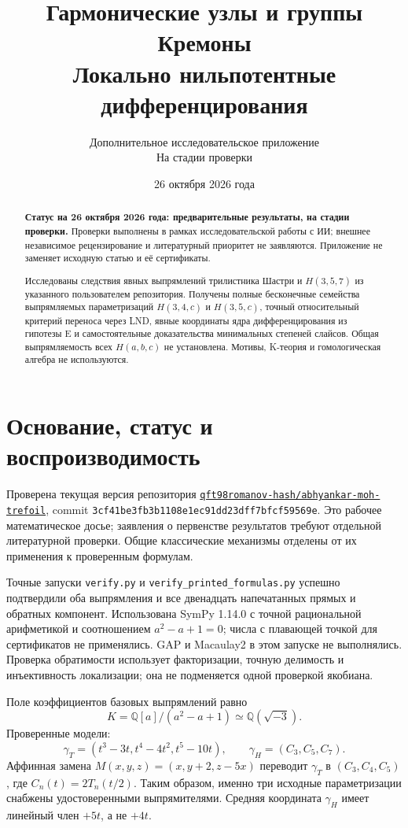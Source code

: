 \documentclass[11pt,a4paper]{article}
\title{\fontsize{18}{23}\selectfont Гармонические узлы и группы Кремоны\protect\\Локально нильпотентные дифференцирования}
\author{Дополнительное исследовательское приложение\\На стадии проверки}
\date{26 октября 2026 года}
\begin{document}
\raggedright
\maketitle
\begin{abstract}
\textbf{Статус на 26 октября 2026 года: предварительные результаты,
на стадии проверки.} Проверки выполнены в рамках исследовательской работы
с ИИ; внешнее независимое рецензирование и литературный приоритет не заявляются.
Приложение не заменяет исходную статью и её сертификаты.


Исследованы следствия явных выпрямлений трилистника Шастри и
$H(3,5,7)$ из указанного пользователем репозитория. Получены полные
бесконечные семейства выпрямляемых параметризаций $H(3,4,c)$ и
$H(3,5,c)$, точный относительный критерий переноса через LND,
явные координаты ядра дифференцирования из гипотезы E и
самостоятельные доказательства минимальных степеней слайсов.
Общая выпрямляемость всех $H(a,b,c)$ не установлена.
Мотивы, K-теория и гомологическая алгебра не используются.
\end{abstract}

\section{Основание, статус и воспроизводимость}
Проверена текущая версия репозитория
\href{https://github.com/qft98romanov-hash/abhyankar-moh-trefoil/tree/3cf41be3fb3b1108e1ec91dd23dff7bfcf59569e}{\texttt{qft98romanov-hash/abhyankar-moh-trefoil}},
commit \texttt{3cf41be3fb3b1108e1ec91dd23dff7bfcf59569e}.
Это рабочее математическое досье; заявления о первенстве результатов
требуют отдельной литературной проверки. Общие классические механизмы
отделены от их применения к проверенным формулам.

Точные запуски \texttt{verify.py} и
\texttt{verify\_printed\_formulas.py} успешно подтвердили оба выпрямления
и все двенадцать напечатанных прямых и обратных компонент.
Использована SymPy 1.14.0 с точной рациональной арифметикой и соотношением
$a^2-a+1=0$; числа с плавающей точкой для сертификатов не применялись.
GAP и Macaulay2 в этом запуске не выполнялись. Проверка обратимости
использует факторизации, точную делимость и инъективность локализации;
она не подменяется одной проверкой якобиана.

Поле коэффициентов базовых выпрямлений равно
\[
K=\mathbb Q[a]/(a^2-a+1)\simeq\mathbb Q(\sqrt{-3}).
\]
Проверенные модели:
\[
\gamma_T=(t^3-3t,t^4-4t^2,t^5-10t),\qquad
\gamma_H=(C_3,C_5,C_7).
\]
Аффинная замена $M(x,y,z)=(x,y+2,z-5x)$ переводит $\gamma_T$
в $(C_3,C_4,C_5)$, где $C_n(t)=2T_n(t/2)$.
Таким образом, именно три исходные параметризации снабжены
удостоверенными выпрямителями. Средняя координата $\gamma_H$ имеет
линейный член $+5t$, а не $+4t$.
\end{document}
